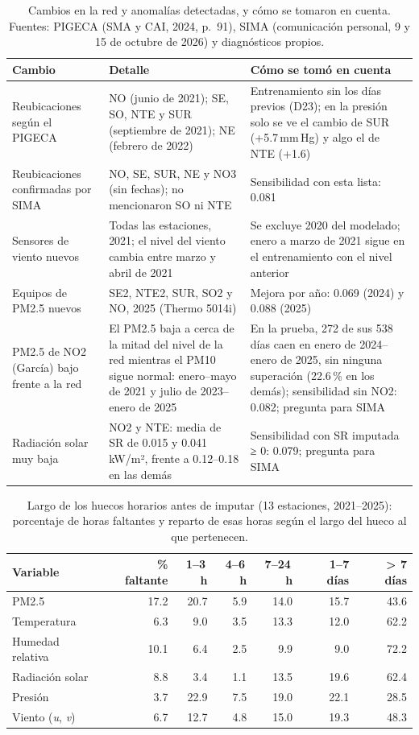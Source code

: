 \begin{table}[H]
\centering\footnotesize
\caption{Cambios en la red y anomalías detectadas, y cómo se tomaron en cuenta. Fuentes: PIGECA (SMA y CAI, 2024, p.~91), SIMA (comunicación personal, 9 y 15 de octubre de 2026) y diagnósticos propios.}
\label{tbl:b-cambios}
\begin{tabularx}{\textwidth}{>{\raggedright\arraybackslash}p{3.3cm}LL}
\toprule
Cambio & Detalle & Cómo se tomó en cuenta\\
\midrule
Reubicaciones según el PIGECA & NO (junio de 2021); SE, SO, NTE y SUR (septiembre de 2021); NE (febrero de 2022) & Entrenamiento sin los días previos (D23); en la presión solo se ve el cambio de SUR (+5.7\,mm\,Hg) y algo el de NTE (+1.6)\\
Reubicaciones confirmadas por SIMA & NO, SE, SUR, NE y NO3 (sin fechas); no mencionaron SO ni NTE & Sensibilidad con esta lista: \dauc{} 0.081\\
Sensores de viento nuevos & Todas las estaciones, 2021; el nivel del viento cambia entre marzo y abril de 2021 & Se excluye 2020 del modelado; enero a marzo de 2021 sigue en el entrenamiento con el nivel anterior\\
Equipos de PM2.5 nuevos & SE2, NTE2, SUR, SO2 y NO, 2025 (Thermo 5014i) & Mejora por año: 0.069 (2024) y 0.088 (2025)\\
PM2.5 de NO2 (García) bajo frente a la red & El PM2.5 baja a cerca de la mitad del nivel de la red mientras el PM10 sigue normal: enero–mayo de 2021 y julio de 2023–enero de 2025 & En la prueba, 272 de sus 538 días caen en enero de 2024–enero de 2025, sin ninguna superación (22.6\,\% en los demás); sensibilidad sin NO2: \dauc{} 0.082; pregunta para SIMA\\
Radiación solar muy baja & NO2 y NTE: media de SR de 0.015 y 0.041\,kW/m², frente a 0.12–0.18 en las demás & Sensibilidad con SR imputada ≥ 0: \dauc{} 0.079; pregunta para SIMA\\
\bottomrule
\end{tabularx}
\end{table}

\begin{table}[H]
\centering\small
\caption{Largo de los huecos horarios antes de imputar (13 estaciones, 2021–2025): porcentaje de horas faltantes y reparto de esas horas según el largo del hueco al que pertenecen.}
\label{tbl:b-huecos}
\begin{tabular}{lrrrrrr}
\toprule
Variable & \% faltante & 1–3\,h & 4–6\,h & 7–24\,h & 1–7 días & > 7 días\\
\midrule
PM2.5 & 17.2 & 20.7 & 5.9 & 14.0 & 15.7 & 43.6\\
Temperatura & 6.3 & 9.0 & 3.5 & 13.3 & 12.0 & 62.2\\
Humedad relativa & 10.1 & 6.4 & 2.5 & 9.9 & 9.0 & 72.2\\
Radiación solar & 8.8 & 3.4 & 1.1 & 13.5 & 19.6 & 62.4\\
Presión & 3.7 & 22.9 & 7.5 & 19.0 & 22.1 & 28.5\\
Viento (\emph{u}, \emph{v}) & 6.7 & 12.7 & 4.8 & 15.0 & 19.3 & 48.3\\
\bottomrule
\end{tabular}
\end{table}

